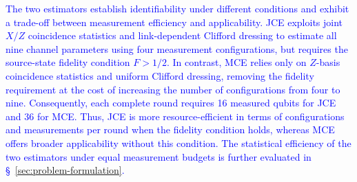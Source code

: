 \textcolor{blue}{
The two estimators establish identifiability under different conditions and exhibit a trade-off between measurement efficiency and applicability. JCE exploits joint $X/Z$ coincidence statistics and link-dependent Clifford dressing to estimate all nine channel parameters using four measurement configurations, but requires the source-state fidelity condition $F>1/2$. In contrast, MCE relies only on $Z$-basis coincidence statistics and uniform Clifford dressing, removing the fidelity requirement at the cost of increasing the number of configurations from four to nine. Consequently, each complete round requires 16 measured qubits for JCE and 36 for MCE. Thus, JCE is more resource-efficient in terms of configurations and measurements per round when the fidelity condition holds, whereas MCE offers broader applicability without this condition. The statistical efficiency of the two estimators under equal measurement budgets is further evaluated in \S~\ref{sec:problem-formulation}.}